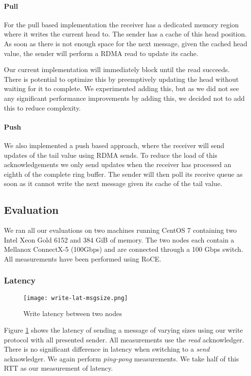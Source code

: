 \paragraph{Pull} For the pull based implementation the receiver has a dedicated memory region where it writes the current 
head to. The sender has a cache of this head position. As soon as there is not enough space for the next message, given 
the cached head value, the sender will perform a RDMA read to update its cache.

Our current implementation will immediately block until the read succeeds. There is potential to optimize this by preemptively 
updating the head without waiting for it to complete. We experimented adding this, but as we did not see any significant 
performance improvements by adding this, we decided not to add this to reduce complexity. 

\paragraph{Push} We also implemented a push based approach, where the receiver will send updates of the tail value using 
RDMA sends. To reduce the load of this acknowledgements we only send updates when the receiver has processed an eighth of 
the complete ring buffer. The sender will then poll its receive queue as soon as it cannot write the next message given its
cache of the tail value.

\subsection{Evaluation}

We ran all our evaluations on two machines running CentOS 7 containing two Intel Xeon Gold 6152 and 384 GiB of memory.
The two nodes each contain a Mellanox ConnectX-5 (100Gbps) and are connected through a 100 Gbps switch. All measurements
have been performed using RoCE.

\subsubsection{Latency}

\begin{figure}[h]
\texttt{[image: write-lat-msgsize.png]}
\caption{Write latency between two nodes}
\label{fig:plot-write-lat}
\end{figure}

Figure \ref{fig:plot-write-lat} shows the latency of sending a message of varying sizes using our write protocol
with all presented sender. All measurements use the \emph{read} acknowledger. There is no significant difference
in latency when switching to a \emph{send} acknowledger. 
We again perform \emph{ping-pong} measurements. We take half of this RTT as our measurement of latency.


